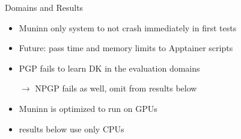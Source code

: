 \documentclass[aspectratio=169,xcolor=dvipsnames]{beamer}
\begin{document}
\begin{frame}{Domains and Results}

  \begin{itemize}
    \item \alert{Muninn} only system to not crash immediately in first tests
    \item Future: pass time and memory limits to Apptainer scripts
  \end{itemize}

  \bigskip
  \pause

  \begin{itemize}
    \item PGP fails to learn DK in the evaluation domains
    \item[$\to$] \alert{NPGP} fails as well, omit from results below
  \end{itemize}
  \bigskip

  \pause

  \begin{itemize}
    \item \alert{Muninn} is optimized to run on GPUs
    \item results below use only CPUs
\end{itemize}

\end{frame}
\end{document}
